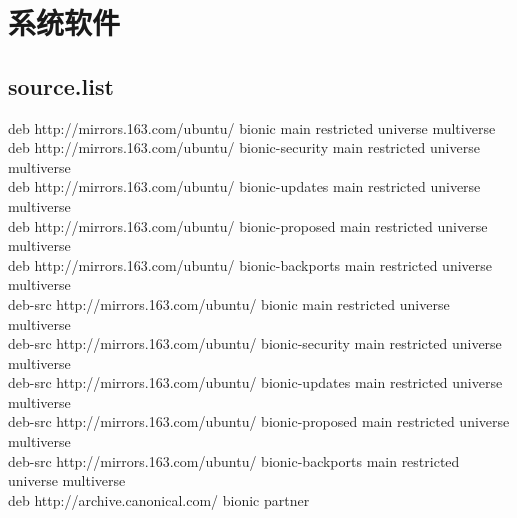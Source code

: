\documentclass{ctexart}
\begin{document}
	\section{系统软件}
	\subsection{source.list}
		\indent deb http://mirrors.163.com/ubuntu/ bionic main restricted universe multiverse	\\
		\indent deb http://mirrors.163.com/ubuntu/ bionic-security main restricted universe multiverse	\\
		\indent deb http://mirrors.163.com/ubuntu/ bionic-updates main restricted universe multiverse	\\
		\indent deb http://mirrors.163.com/ubuntu/ bionic-proposed main restricted universe multiverse	\\
		\indent deb http://mirrors.163.com/ubuntu/ bionic-backports main restricted universe multiverse	\\
		\indent deb-src http://mirrors.163.com/ubuntu/ bionic main restricted universe multiverse	\\
		\indent deb-src http://mirrors.163.com/ubuntu/ bionic-security main restricted universe multiverse	\\
		\indent deb-src http://mirrors.163.com/ubuntu/ bionic-updates main restricted universe multiverse	\\
		\indent deb-src http://mirrors.163.com/ubuntu/ bionic-proposed main restricted universe multiverse	\\
		\indent deb-src http://mirrors.163.com/ubuntu/ bionic-backports main restricted universe multiverse	\\
		\indent deb http://archive.canonical.com/ bionic partner	\\
		
\end{document}
